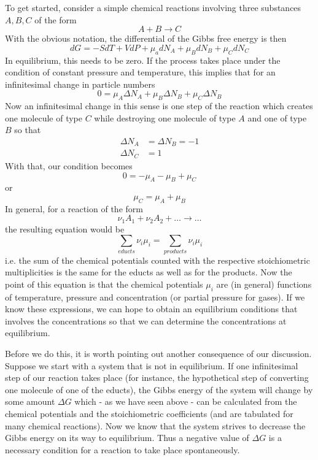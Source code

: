 \documentclass[a4paper, draft]{report}
\numberwithin{section}{chapter}
\numberwithin{equation}{chapter}
\theoremstyle{own}
\theoremstyle{remark}
\begin{document}
To get started, consider a simple chemical reactions involving three substances $A, B, C$ of the form
$$
A + B \longrightarrow C
$$
With the obvious notation, the differential of the Gibbs free energy is then
$$
dG = - S dT + V dP + \mu_a dN_A + \mu_B dN_B + \mu_C dN_C
$$
In equilibrium, this needs to be zero. If the process takes place under the condition of constant pressure and temperature, this implies that for an infinitesimal change in particle numbers
$$
0 =  \mu_A \Delta N_A + \mu_B \Delta N_B + \mu_C \Delta N_B
$$
Now an infinitesimal change in this sense is one step of the reaction which creates one molecule of type $C$ while destroying one molecule of type $A$ and one of type $B$ so that
\begin{align*}
\Delta N_A &= \Delta N_B = -1 \\
\Delta N_C &= 1
\end{align*}
With that, our condition becomes
$$
0 = - \mu_A - \mu_B + \mu_C
$$
or
$$
\mu_C = \mu_A + \mu_B
$$
In general, for a reaction of the form
$$
\nu_1 A_1 + \nu_2 A_2 +  \dots \longrightarrow \dots
$$
the resulting equation would be 
$$
\sum_{educts} \nu_i \mu_i = \sum_{products} \nu_i \mu_i
$$
i.e. the sum of the chemical potentials counted with the respective stoichiometric multiplicities is the same for the educts as well as for the products. Now the point of this equation is that the chemical potentials $\mu_i$ are (in general) functions of temperature, pressure and concentration (or partial pressure for gases). If we know these expressions, we can hope to obtain an equilibrium conditions that involves the concentrations so that we can determine the concentrations at equilibrium.

Before we do this, it is worth pointing out another consequence of our discussion. Suppose we start with a system that is not in equilibrium. If one infinitesimal step of our reaction takes place (for instance, the hypothetical step of converting one molecule of one of the educts), the Gibbs energy of the system will change by some amount $\Delta G$ which - as we have seen above - can be calculated from the chemical potentials and the stoichiometric coefficients (and are tabulated for many chemical reactions). Now we know that the system strives to decrease the Gibbs energy on its way to equilibrium. Thus a negative value of $\Delta G$ is a necessary condition for a reaction to take place spontaneously. 
\end{document}

